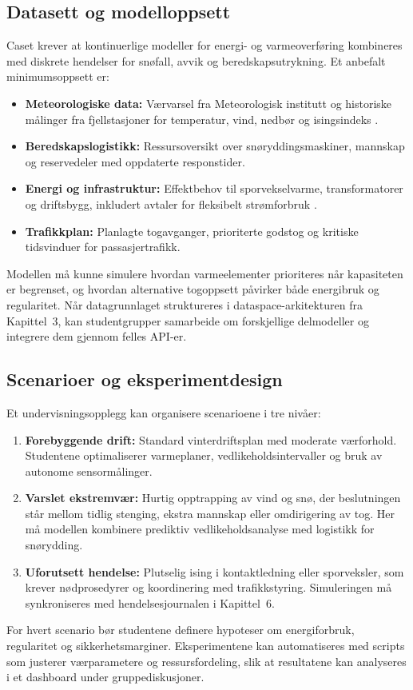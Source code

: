 \subsection{Datasett og modelloppsett}
Caset krever at kontinuerlige modeller for energi- og varmeoverføring kombineres med diskrete hendelser for snøfall, avvik og beredskapsutrykning. Et anbefalt minimumsoppsett er:
\begin{itemize}
    \item \textbf{Meteorologiske data:} Værvarsel fra Meteorologisk institutt og historiske målinger fra fjellstasjoner for temperatur, vind, nedbør og isingsindeks \citep{met2023fjellvaer}.
    \item \textbf{Beredskapslogistikk:} Ressursoversikt over snøryddingsmaskiner, mannskap og reservedeler med oppdaterte responstider.
    \item \textbf{Energi og infrastruktur:} Effektbehov til sporvekselvarme, transformatorer og driftsbygg, inkludert avtaler for fleksibelt strømforbruk \citep{jernbanedirektoratet2022energi}.
    \item \textbf{Trafikkplan:} Planlagte togavganger, prioriterte godstog og kritiske tidsvinduer for passasjertrafikk.
\end{itemize}
Modellen må kunne simulere hvordan varmeelementer prioriteres når kapasiteten er begrenset, og hvordan alternative togoppsett påvirker både energibruk og regularitet. Når datagrunnlaget struktureres i dataspace-arkitekturen fra Kapittel~3, kan studentgrupper samarbeide om forskjellige delmodeller og integrere dem gjennom felles API-er.

\subsection{Scenarioer og eksperimentdesign}
Et undervisningsopplegg kan organisere scenarioene i tre nivåer:
\begin{enumerate}
    \item \textbf{Forebyggende drift:} Standard vinterdriftsplan med moderate værforhold. Studentene optimaliserer varmeplaner, vedlikeholdsintervaller og bruk av autonome sensormålinger.
    \item \textbf{Varslet ekstremvær:} Hurtig opptrapping av vind og snø, der beslutningen står mellom tidlig stenging, ekstra mannskap eller omdirigering av tog. Her må modellen kombinere prediktiv vedlikeholdsanalyse med logistikk for snørydding.
    \item \textbf{Uforutsett hendelse:} Plutselig ising i kontaktledning eller sporveksler, som krever nødprosedyrer og koordinering med trafikkstyring. Simuleringen må synkroniseres med hendelsesjournalen i Kapittel~6.
\end{enumerate}
For hvert scenario bør studentene definere hypoteser om energiforbruk, regularitet og sikkerhetsmarginer. Eksperimentene kan automatiseres med scripts som justerer værparametere og ressursfordeling, slik at resultatene kan analyseres i et dashboard under gruppediskusjoner.

